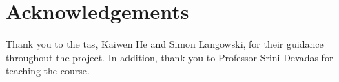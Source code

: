\section{Acknowledgements}
\label{sec:acknowledgements}

Thank you to the \glspl{ta}, Kaiwen He and Simon Langowski, for their guidance throughout the project. In addition, thank you to Professor Srini Devadas for teaching the course.
